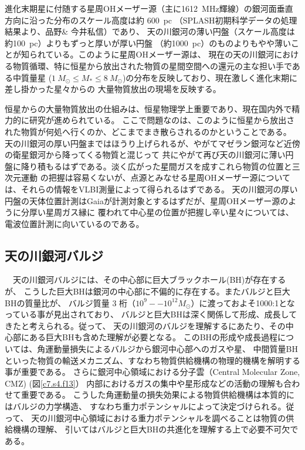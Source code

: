 進化末期星に付随する星周OHメーザー源（主に1612~MHz輝線）の銀河面垂直方向に沿った分布のスケール高度は約 600~pc
（SPLASH初期科学データ\citep{2014MNRAS.439.1596D}の処理結果より、品野\& 今井私信）であり、
天の川銀河の薄い円盤（スケール高度は約100~pc）よりもずっと厚いが厚い円盤
（約1000~pc）のものよりもやや薄いことが知られている。このように星周OHメーザー源は、
現在の天の川銀河における物質循環、特に恒星から放出された物質の星間空間への還元の主な担い手である中質量星
($1\:M_{\odot}\leq M_{\ast}\leq 8\:M_{\odot}$)の分布を反映しており、現在激しく進化末期に差し掛かった星々からの
大量物質放出の現場を反映する。

恒星からの大量物質放出の仕組みは、恒星物理学上重要であり、現在国内外で精力的に研究が進められている。
ここで問題なのは、このように恒星から放出された物質が何処へ行くのか、どこまでまき散らされるのかということである。
天の川銀河の厚い円盤まではほうり上げられるが、やがてマゼラン銀河など近傍の衛星銀河から降ってくる物質と混じって
共にやがて再び天の川銀河に薄い円盤に降り積もるはずである。淡く広がった星間ガスを成すこれら物質の位置と三次元運動
の把握は容易くないが、点源とみなせる星周OHメーザー源については、それらの情報をVLBI測量によって得られるはずである。
天の川銀河の厚い円盤の天体位置計測はGaiaが計測対象とするはずだが、星周OHメーザー源のように分厚い星周ガス縁に
覆われて中心星の位置が把握し辛い星々については、電波位置計測に向いているのである。

\setcounter{subsection}{2}\subsection{天の川銀河バルジ}\label{c7.s4.ss3}

　天の川銀河バルジには、その中心部に巨大ブラックホール(BH)が存在するが、
こうした巨大BHは銀河の中心部に不偏的に存在する。またバルジと巨大BHの質量比が、
バルジ質量 3 桁（$10^{9}--10^{12} M_{\odot}$）に渡っておよそ1000:1となっている事が見出されており、
バルジと巨大BHは深く関係して形成、成長してきたと考えられる。従って、
天の川銀河のバルジを理解するにあたり、その中心部にある巨大BHも含めた理解が必要となる。
このBHの形成や成長過程については、角運動量損失によるバルジから銀河中心部へのガスや星、
中間質量BHといった物質の輸送メカニズム、すなわち物質供給機構の物理的機構を解明する事が重要である。
さらに銀河中心領域における分子雲（Central Molecular Zone, CMZ) (図\ref{c7.s4.f13}）
内部におけるガスの集中や星形成などの活動の理解も合わせて重要である。
こうした角運動量の損失効果による物質供給機構は本質的にはバルジの力学構造、
すなわち重力ポテンシャルによって決定づけられる。従って、
天の川銀河中心領域における重力ポテンシャルを調べることは物質の供給機構の理解、
引いてはバルジと巨大BHの共進化を理解する上で必要不可欠である。

